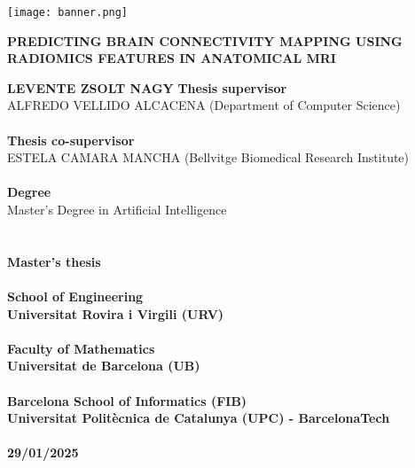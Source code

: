 \begin{titlepage}
    \begin{center}
        \begingroup
          \let\clearpage\relax
          \texttt{[image: banner.png]}
          \vfill
          \LARGE
          \begin{center}
          \textbf{\MakeUppercase{Predicting Brain Connectivity Mapping Using Radiomics Features in Anatomical MRI}}
          \end{center}
          \vfill
          \large
          \textbf{\MakeUppercase{Levente Zsolt Nagy}}
          \vfill
          \normalsize
          \textbf{Thesis supervisor}\\
          \MakeUppercase{Alfredo Vellido Alcacena} (Department of Computer Science)\\
          \hfill\\
          \textbf{Thesis co-supervisor}\\
          \MakeUppercase{Estela Camara Mancha} (Bellvitge Biomedical Research Institute)\\
          \hfill\\
          \textbf{Degree}\\
          Master's Degree in Artificial Intelligence\\
          \hfill\\\hfill\\
          \textbf{Master's thesis}\\
          \hfill\\
          \textbf{School of Engineering}\\
          \textbf{Universitat Rovira i Virgili (URV)}\\
          \hfill\\
          \textbf{Faculty of Mathematics}\\
          \textbf{Universitat de Barcelona (UB)}\\
          \hfill\\
          \textbf{Barcelona School of Informatics (FIB)}\\
          \textbf{Universitat Politècnica de Catalunya (UPC) - BarcelonaTech}\\
          \hfill\\
          \textbf{29/01/2025}\\
          \hfill\\
          
        \endgroup
    \end{center}
\end{titlepage}